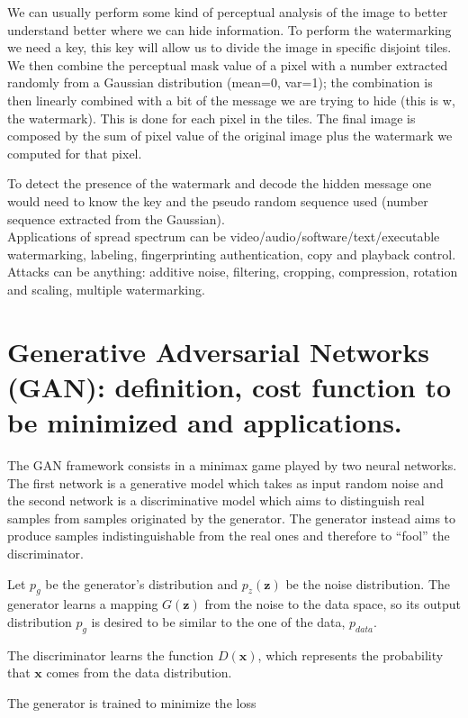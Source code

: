 \documentclass[a4paper, 12pt]{article}
\begin{document}
We can usually perform some kind of perceptual analysis of the image to better understand better where we can hide information. To perform the watermarking we need a key, this key will allow us to divide the image in specific disjoint tiles. We then combine the perceptual mask value of a pixel with a number extracted randomly from a Gaussian distribution (mean=0, var=1); the combination is then linearly combined with a bit of the message we are trying to hide (this is w, the watermark). This is done for each pixel in the tiles. The final image is composed by the sum of pixel value of the original image plus the watermark we computed for that pixel.

To detect the presence of the watermark and decode the hidden message one would need to know the key and the pseudo random sequence used (number sequence extracted from the Gaussian).\\
Applications of spread spectrum can be video/audio/software/text/executable watermarking, labeling, fingerprinting authentication, copy and playback control.\\
Attacks can be anything: additive noise, filtering, cropping, compression, rotation and scaling, multiple watermarking.

\section{Generative Adversarial Networks (GAN): definition, cost function to be minimized and applications.}

The GAN framework consists in a minimax game played by two neural networks. The first network is a generative model which takes as input random noise and the second network is a discriminative model which aims to distinguish real samples from samples originated by the generator. The generator instead aims to produce samples indistinguishable from the real ones and therefore to ``fool'' the discriminator.

Let $p_g$ be the generator's distribution and $p_z(\mathbf{z})$ be the noise distribution. The generator learns a mapping $G(\mathbf{z})$ from the noise to the data space, so its output distribution $p_g$ is desired to be similar to the one of the data, $p_{data}$.

The discriminator learns the function $D(\mathbf{x})$, which represents the probability that $\mathbf{x}$ comes from the data distribution.

The generator is trained to minimize the loss
\end{document}
